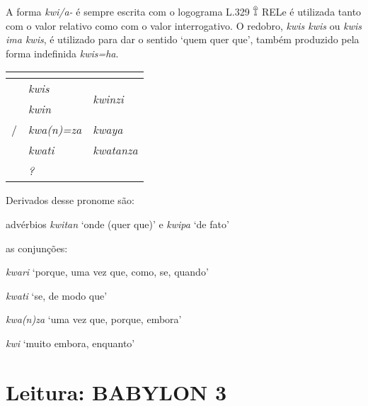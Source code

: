 A forma \emph{kwi\slash{}a-} é sempre escrita com o logograma L.329 𔕰 REL\@ e
é utilizada tanto com o valor relativo como com o valor interrogativo.
O redobro, \emph{kwis kwis} ou \emph{kwis ima kwis}, é utilizado para dar o
sentido `quem quer que', também produzido pela forma indefinida \emph{kwis=ha}.

\begin{center}
	\begin{tabular}[c]{lll}
		\toprule
		                 & \Sg{}\emph{}       & \Pl{}\emph{}                     \\
		\midrule
		\Nom{} \Com{}    & \emph{kwis}        & \multirow{2}{4em}{\emph{kwinzi}} \\
		\Acu{} \Com{}    & \emph{kwin}        &                                  \\
		\Nom/\Acu\Neut{} & \emph{kwa{(n)}=za} & \emph{kwaya}                     \\
		\Dat{}           & \emph{kwati}       & \emph{kwatanza}                  \\
		\Abl{}           & \emph{?}           & \emph{}                          \\
		\bottomrule
	\end{tabular}
\end{center}

\noindent Derivados desse pronome são:
\begin{compactitem}
	\item advérbios \emph{kwitan} `onde (quer que)' e \emph{kwipa} `de fato'
	\item as conjunções:
	\begin{compactitem}
		\item \emph{kwari} `porque, uma vez que, como, se, quando'
		\item \emph{kwati} `se, de modo que'
		\item \emph{kwa{(n)}za} `uma vez que, porque, embora'
		\item \emph{kwi} `muito embora, enquanto'
	\end{compactitem}
\end{compactitem}


\clearpage

\section{Leitura: BABYLON 3}

